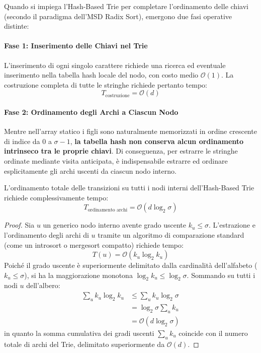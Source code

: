 Quando si impiega l'Hash-Based Trie per completare l'ordinamento delle chiavi (secondo il paradigma dell'MSD Radix Sort), emergono due fasi operative distinte:

\paragraph{Fase 1: Inserimento delle Chiavi nel Trie}
L'inserimento di ogni singolo carattere richiede una ricerca ed eventuale inserimento nella tabella hash locale del nodo, con costo medio $\mathcal{O}(1)$. La costruzione completa di tutte le stringhe richiede pertanto tempo:
\begin{equation}
  T_{\text{costruzione}} = \mathcal{O}(d)
\end{equation}

\paragraph{Fase 2: Ordinamento degli Archi a Ciascun Nodo}
Mentre nell'array statico i figli sono naturalmente memorizzati in ordine crescente di indice da $0$ a $\sigma - 1$, \textbf{la tabella hash non conserva alcun ordinamento intrinseco tra le proprie chiavi}. Di conseguenza, per estrarre le stringhe ordinate mediante visita anticipata, \`e indispensabile estrarre ed ordinare esplicitamente gli archi uscenti da ciascun nodo interno.

\begin{theorem}
\label{thm:costo-ordinamento-hash-trie}
L'ordinamento totale delle transizioni su tutti i nodi interni dell'Hash-Based Trie richiede complessivamente tempo:
\begin{equation}
  T_{\text{ordinamento archi}} = \mathcal{O}(d \log_2 \sigma)
\end{equation}
\end{theorem}

\begin{proof}
Sia $u$ un generico nodo interno avente grado uscente $k_u \le \sigma$. L'estrazione e l'ordinamento degli archi di $u$ tramite un algoritmo di comparazione standard (come un introsort o mergesort compatto) richiede tempo:
\begin{equation}
  T(u) = \mathcal{O}(k_u \log_2 k_u)
\end{equation}
Poich\'e il grado uscente \`e superiormente delimitato dalla cardinalit\`a dell'alfabeto ($k_u \le \sigma$), si ha la maggiorazione monotona $\log_2 k_u \le \log_2 \sigma$. Sommando su tutti i nodi $u$ dell'albero:
\begin{align}
  \sum_{u} k_u \log_2 k_u &\le \sum_{u} k_u \log_2 \sigma \nonumber \\
                          &= \log_2 \sigma \sum_{u} k_u \nonumber \\
                          &= \mathcal{O}(d \log_2 \sigma)
\end{align}
in quanto la somma cumulativa dei gradi uscenti $\sum_u k_u$ coincide con il numero totale di archi del Trie, delimitato superiormente da $\mathcal{O}(d)$.
\end{proof}

